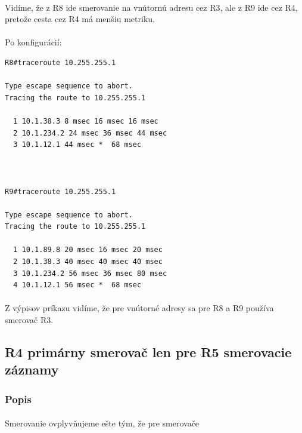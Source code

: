 \documentclass[12pt,twoside,a4paper]{report}
\begin{document}
\paragraph{}
Vidíme, že z R8 ide smerovanie na vnútornú adresu cez R3, ale z R9 ide cez R4, pretože cesta cez R4 má menšiu metriku.



\paragraph{}
Po konfigurácií:

\noindent
{\selectfont
\begin{small}
\begin{verbatim}
R8#traceroute 10.255.255.1

Type escape sequence to abort.
Tracing the route to 10.255.255.1

  1 10.1.38.3 8 msec 16 msec 16 msec
  2 10.1.234.2 24 msec 36 msec 44 msec
  3 10.1.12.1 44 msec *  68 msec



R9#traceroute 10.255.255.1

Type escape sequence to abort.
Tracing the route to 10.255.255.1

  1 10.1.89.8 20 msec 16 msec 20 msec
  2 10.1.38.3 40 msec 40 msec 40 msec
  3 10.1.234.2 56 msec 36 msec 80 msec
  4 10.1.12.1 56 msec *  68 msec
\end{verbatim}
\end{small}
}

\paragraph{}
Z výpisov príkazu  vidíme, že pre vnútorné adresy sa pre R8 a R9 používa smerovač R3.






\subsection{R4 primárny smerovač len pre R5 smerovacie záznamy}
\subsubsection{Popis}
\paragraph{}
Smerovanie ovplyvňujeme ešte tým, že pre smerovače 
\end{document}
